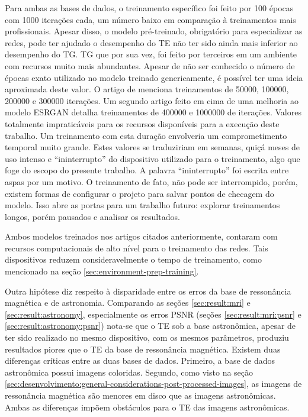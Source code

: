 Para ambas as bases de dados, o treinamento específico foi feito por 100 épocas com 1000 iterações cada, um número baixo em comparação à treinamentos mais profissionais. Apesar disso, o modelo pré-treinado, obrigatório para especializar as redes, pode ter ajudado o desempenho do TE não ter sido ainda mais inferior ao desempenho do TG. TG que por sua vez, foi feito por terceiros em um ambiente com recursos muito mais abundantes. Apesar de não ser conhecido o número de épocas exato utilizado no modelo treinado genericamente, é possível ter uma ideia aproximada deste valor. O artigo de  menciona treinamentos de 50000, 100000, 200000 e 300000 iterações. Um segundo artigo feito em cima de uma melhoria ao modelo ESRGAN \cite{wang_real-esrgan_2021} detalha treinamentos de 400000 e 1000000 de iterações. Valores totalmente impraticáveis para os recursos disponíveis para a execução deste trabalho. Um treinamento com esta duração envolveria um comprometimento temporal muito grande. Estes valores se traduziriam em semanas, quiçá meses de uso intenso e ``ininterrupto'' do dispositivo utilizado para o treinamento, algo que foge do escopo do presente trabalho. A palavra ``ininterrupto'' foi escrita entre aspas por um motivo. O treinamento de fato, não pode ser interrompido, porém, existem formas de configurar o projeto para salvar pontos de checagem do modelo. Isso abre as portas para um trabalho futuro: explorar treinamentos longos, porém pausados e analisar os resultados.

Ambos modelos treinados nos artigos citados anteriormente, contaram com recursos computacionais de alto nível para o treinamento das redes. Tais dispositivos reduzem consideravelmente o tempo de treinamento, como mencionado na seção \ref{sec:environment-prep-training}. 

Outra hipótese diz respeito à disparidade entre os erros da base de ressonância magnética e de astronomia. Comparando as seções \ref{sec:result:mri} e \ref{sec:result:astronomy}, especialmente os erros PSNR (seções \ref{sec:result:mri:psnr} e \ref{sec:result:astronomy:psnr}) nota-se que o TE sob a base astronômica, apesar de ter sido realizado no mesmo dispositivo, com os mesmos parâmetros, produziu resultados piores que o TE da base de ressonância magnética. Existem duas diferenças críticas entre as duas bases de dados. Primeiro, a base de dados astronômica possui imagens coloridas. Segundo, como visto na seção \ref{sec:desenvolvimento:general-considerations-post-processed-images}, as imagens de ressonância magnética são menores em disco que as imagens astronômicas. Ambas as diferenças impõem obstáculos para o TE das imagens astronômicas. 

